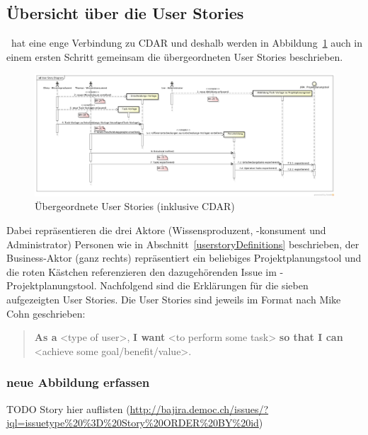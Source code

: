 	\subsection{Übersicht über die User Stories}
	
		\eeppi\ hat eine enge Verbindung zu CDAR und deshalb werden in Abbildung~\ref{fig:UserStoryDiagram} auch in einem ersten Schritt gemeinsam die übergeordneten User Stories beschrieben.
	
		\begin{figure}[H]
			\begin{minipage}[b]{\linewidth}
				\includegraphics[width=\textwidth]{media/diagrams/UserStoryDiagram.png}
				\centering
				\caption{Übergeordnete User Stories (inklusive CDAR)}
				\label{fig:UserStoryDiagram}
			\end{minipage}
		\end{figure}
		
		Dabei repräsentieren die drei Aktore (Wissensproduzent, -konsument und Administrator) Personen wie in Abschnitt~\ref{userstoryDefinitions} beschrieben,
		der Business-Aktor (ganz rechts) repräsentiert ein beliebiges Projektplanungstool und die roten Kästchen referenzieren den dazugehörenden Issue im \eeppi-Projektplanungstool.
		Nachfolgend sind die Erklärungen für die sieben aufgezeigten User Stories.
		Die User Stories sind jeweils im Format nach Mike Cohn\cite{jonathanRasmussonTheAgileSamurai} geschrieben:
		\begin{quote}
			\textbf{As a} <type of user>,\newline
			\textbf{I want} <to perform some task>\newline
			\textbf{so that I can} <achieve some goal/benefit/value>.
		\end{quote}
		
	\subsubsection{neue Abbildung erfassen}
		TODO Story hier auflisten (\url{http://bajira.democ.ch/issues/?jql=issuetype\%20\%3D\%20Story\%20ORDER\%20BY\%20id})

